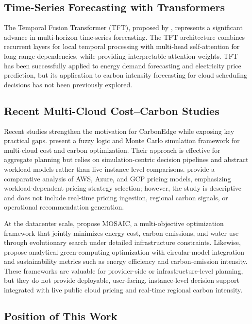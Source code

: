 \documentclass[12pt]{article}
\begin{document}
\subsection{Time-Series Forecasting with Transformers}

The Temporal Fusion Transformer (TFT), proposed by \citet{b15}, represents a significant advance in multi-horizon time-series forecasting. The TFT architecture combines recurrent layers for local temporal processing with multi-head self-attention for long-range dependencies, while providing interpretable attention weights. TFT has been successfully applied to energy demand forecasting \citep{b16} and electricity price prediction, but its application to carbon intensity forecasting for cloud scheduling decisions has not been previously explored.

\subsection{Recent Multi-Cloud Cost--Carbon Studies}

Recent studies strengthen the motivation for CarbonEdge while exposing key practical gaps. \citet{b17} present a fuzzy logic and Monte Carlo simulation framework for multi-cloud cost and carbon optimization. Their approach is effective for aggregate planning but relies on simulation-centric decision pipelines and abstract workload models rather than live instance-level comparisons. \citet{b18} provide a comparative analysis of AWS, Azure, and GCP pricing models, emphasizing workload-dependent pricing strategy selection; however, the study is descriptive and does not include real-time pricing ingestion, regional carbon signals, or operational recommendation generation.

At the datacenter scale, \citet{b19} propose MOSAIC, a multi-objective optimization framework that jointly minimizes energy cost, carbon emissions, and water use through evolutionary search under detailed infrastructure constraints. Likewise, \citet{b20} propose analytical green-computing optimization with circular-model integration and sustainability metrics such as energy efficiency and carbon-emission intensity. These frameworks are valuable for provider-side or infrastructure-level planning, but they do not provide deployable, user-facing, instance-level decision support integrated with live public cloud pricing and real-time regional carbon intensity.

\subsection{Position of This Work}
\end{document}
